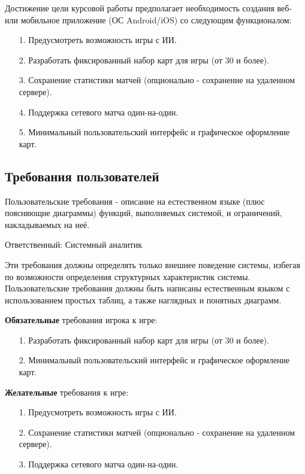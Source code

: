 \documentclass[12pt, a4paper, simple]{eskdtext}
\begin{document}
    Достижение цели курсовой работы предполагает необходимость создания веб- или мобильное приложение (ОС Android/iOS) со следующим функционалом:
    
    \begin{enumerate}
        \item[1.] Предусмотреть возможность игры с ИИ.
        \item[2.] Разработать фиксированный набор карт для игры (от 30 и более).
        \item[3.] Сохранение статистики матчей (опционально - сохранение на удаленном сервере).
        \item[4.] Поддержка сетевого матча один-на-один.
        \item[5.] Минимальный пользовательский интерфейс и графическое оформление карт.
    \end{enumerate}
    
    \subsection{Требования пользователей}

    Пользовательские требования - описание на естественном языке (плюс поясняющие диаграммы) функций, выполняемых системой, и ограничений, накладываемых на неё.

    Ответственный: Системный аналитик

    Эти требования должны определять только внешнее поведение системы, избегая по возможности определения структурных характеристик системы.
    Пользовательские требования должны быть написаны естественным языком с использованием простых таблиц, а также наглядных и понятных диаграмм.

    \textbf{Обязательные} требования игрока к игре:

    \begin{enumerate}
        \item [1.] Разработать фиксированный набор карт для игры (от 30 и более).
        \item [2.] Минимальный пользовательский интерфейс и графическое оформление карт.
    \end{enumerate}

    \textbf{Желательные} требования к игре:

    \begin{enumerate}
        \item [1.] Предусмотреть возможность игры с ИИ.
        \item [2.] Сохранение статистики матчей (опционально - сохранение на удаленном сервере).
        \item [3.] Поддержка сетевого матча один-на-один.
    \end{enumerate}
\end{document}
